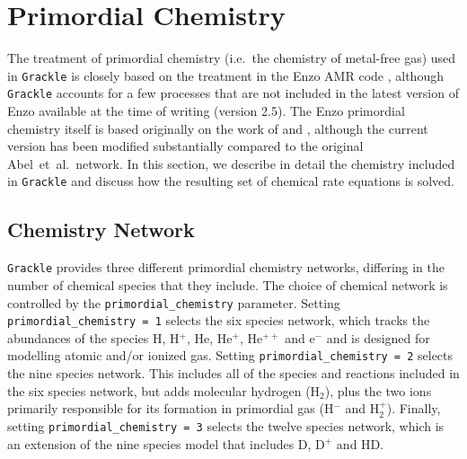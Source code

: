 


\section{Primordial Chemistry} \label{sec:primordial_chemistry}
The treatment of primordial chemistry (i.e.\ the chemistry of metal-free gas) used in \texttt{Grackle} is closely based on the
treatment in the Enzo AMR code \citep{2014ApJS..211...19B}, although \texttt{Grackle} accounts for a few processes that are not included 
in the latest version of Enzo available at the time of writing (version 2.5). The Enzo primordial chemistry itself is based 
originally on the work of \citet{1997NewA....2..181A} and \citet{1997NewA....2..209A}, although the current version has been
modified substantially compared to the original Abel~et~al.\ network. In this section, we describe in detail the chemistry 
included in \texttt{Grackle} and discuss how the resulting set of chemical rate equations is solved. 

\subsection{Chemistry Network} \label{sec:network}
\texttt{Grackle} provides three different primordial chemistry networks, differing in the number of chemical species that they include. 
The choice of chemical network is controlled by the \texttt{primordial\_chemistry} parameter. Setting \texttt{primordial\_chemistry = 1} selects the
six species network, which tracks the abundances of the species H, H$^{+}$, He, He$^{+}$, He$^{++}$ and e$^{-}$ and is 
designed for modelling atomic and/or ionized gas. Setting \texttt{primordial\_chemistry = 2} selects the nine species network. This
includes all of the species and reactions included in the six species network, but adds molecular hydrogen (H$_2$), plus the
two ions primarily responsible for its formation in primordial gas (H$^{-}$ and H$_{2}^{+}$). Finally, setting \texttt{primordial\_chemistry = 3}
selects the twelve species network, which is an extension of the nine species model that includes D, D$^{+}$ and HD.

